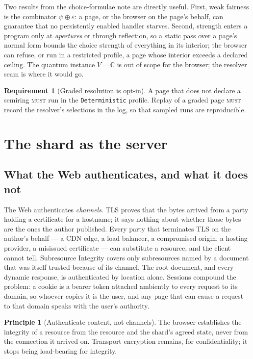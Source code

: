 \documentclass[11pt]{article}
\theoremstyle{definition}
\newtheorem{requirement}{Requirement}
\newtheorem{principle}{Principle}
\theoremstyle{remark}
\newcommand{\MUST}{\textsc{must}}
\newcommand{\code}[1]{\texttt{#1}}
\begin{document}
\noindent
Two results from the choice-formulae note are directly useful. First, weak fairness
is the combinator $\psi\oplus\varepsilon$: a page, or the browser on the page's behalf,
can guarantee that no persistently enabled handler starves. Second, strength enters a
program only at \emph{apertures} or through reflection, so a static pass over a page's
normal form bounds the choice strength of everything in its interior; the browser can
refuse, or run in a restricted profile, a page whose interior exceeds a declared
ceiling. The quantum instance $V=\mathbb{C}$ is out of scope for the browser; the
resolver seam is where it would go.

\begin{requirement}[Graded resolution is opt-in]
A page that does not declare a semiring \MUST{} run in the \code{Deterministic}
profile. Replay of a graded page \MUST{} record the resolver's selections in the log,
so that sampled runs are reproducible.
\end{requirement}

\section{The shard as the server}\label{sec:shard}

\subsection{What the Web authenticates, and what it does not}

The Web authenticates \emph{channels}. TLS proves that the bytes arrived from a
party holding a certificate for a hostname; it says nothing about whether those bytes
are the ones the author published. Every party that terminates TLS on the author's
behalf --- a CDN edge, a load balancer, a compromised origin, a hosting provider, a
misissued certificate --- can substitute a resource, and the client cannot tell.
Subresource Integrity covers only subresources named by a document that was itself
trusted because of its channel. The root document, and every dynamic response, is
authenticated by location alone. Sessions compound the problem: a cookie is a bearer
token attached ambiently to every request to its domain, so whoever copies it is the
user, and any page that can cause a request to that domain speaks with the user's
authority.

\begin{principle}[Authenticate content, not channels]
The browser establishes the integrity of a resource from the resource and the
shard's agreed state, never from the connection it arrived on. Transport encryption
remains, for confidentiality; it stops being load-bearing for integrity.
\end{principle}
\end{document}
